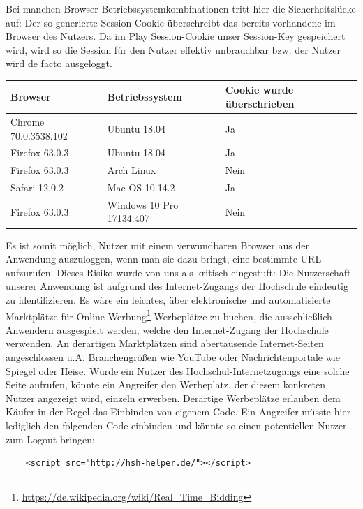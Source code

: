 \documentclass[12pt,DIV14,BCOR10mm,a4paper,parskip=half-,headsepline,headinclude,english,ngerman,bibliography=totocnumbered]{scrreprt}
\begin{document}
Bei manchen Browser-Betriebssystemkombinationen tritt hier die Sicherheitslücke auf: Der so generierte Session-Cookie überschreibt das bereits vorhandene im Browser des Nutzers. Da im Play Session-Cookie unser Session-Key gespeichert wird, wird so die Session für den Nutzer effektiv unbrauchbar bzw. der Nutzer wird de facto ausgeloggt.

\begin{center}
    \begin{tabular}{ | l | l | l | }
    \hline
    	Browser & Betriebssystem & Cookie wurde überschrieben \\ \hline
    	Chrome 70.0.3538.102 & Ubuntu 18.04 & Ja \\ \hline
    	Firefox 63.0.3 & Ubuntu 18.04 & Ja \\ \hline
    	Firefox 63.0.3 & Arch Linux & Nein \\ \hline
    	Safari 12.0.2 & Mac OS 10.14.2 & Ja \\ \hline
    	Firefox 63.0.3 & Windows 10 Pro 17134.407 & Nein \\ \hline
    \end{tabular}
\end{center}

Es ist somit möglich, Nutzer mit einem verwundbaren Browser aus der Anwendung auszuloggen, wenn man sie dazu bringt, eine bestimmte URL aufzurufen. Dieses Risiko wurde von uns als kritisch eingestuft: Die Nutzerschaft unserer Anwendung ist aufgrund des Internet-Zugangs der Hochschule eindeutig zu identifizieren. Es wäre ein leichtes, über elektronische und automatisierte Marktplätze für Online-Werbung\footnote{\url{https://de.wikipedia.org/wiki/Real_Time_Bidding}} Werbeplätze zu buchen, die ausschließlich Anwendern ausgespielt werden, welche den Internet-Zugang der Hochschule verwenden. An derartigen Marktplätzen sind abertausende Internet-Seiten angeschlossen u.A. Branchengrößen wie YouTube oder Nachrichtenportale wie Spiegel oder Heise. Würde ein Nutzer des Hochschul-Internetzugangs eine solche Seite aufrufen, könnte ein Angreifer den Werbeplatz, der diesem konkreten Nutzer angezeigt wird, einzeln erwerben. Derartige Werbeplätze erlauben dem Käufer in der Regel das Einbinden von eigenem Code. Ein Angreifer müsste hier lediglich den folgenden Code einbinden und könnte so einen potentiellen Nutzer zum Logout bringen:

\begin{lstlisting}
	<script src="http://hsh-helper.de/"></script>
\end{lstlisting}
\end{document}
